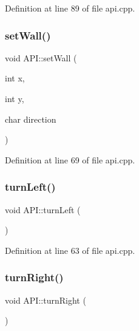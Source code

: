 Definition at line 89 of file api.\+cpp.

\mbox{\label{class_a_p_i_a9b0b04cf1cfc62ae6f5eef1ac1729eb2}} 
\subsubsection{\texorpdfstring{set\+Wall()}{setWall()}}
{\footnotesize\ttfamily void A\+P\+I\+::set\+Wall (\begin{DoxyParamCaption}\item[{int}]{x,  }\item[{int}]{y,  }\item[{char}]{direction }\end{DoxyParamCaption})\hspace{0.3cm}{\ttfamily [static]}}



Definition at line 69 of file api.\+cpp.

\mbox{\label{class_a_p_i_af04ee9209026f2a6e1c502e6c900573f}} 
\subsubsection{\texorpdfstring{turn\+Left()}{turnLeft()}}
{\footnotesize\ttfamily void A\+P\+I\+::turn\+Left (\begin{DoxyParamCaption}{ }\end{DoxyParamCaption})\hspace{0.3cm}{\ttfamily [static]}}



Definition at line 63 of file api.\+cpp.

\mbox{\label{class_a_p_i_a4b5aaf5e3e061474d84191ab9ee05d63}} 
\subsubsection{\texorpdfstring{turn\+Right()}{turnRight()}}
{\footnotesize\ttfamily void A\+P\+I\+::turn\+Right (\begin{DoxyParamCaption}{ }\end{DoxyParamCaption})\hspace{0.3cm}{\ttfamily [static]}}




